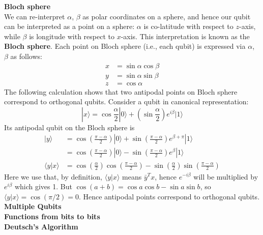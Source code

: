 \textbf{Bloch sphere}\\
We can re-interpret $\alpha$, $\beta$ as polar coordinates on a sphere,
and hence our qubit can be interpreted as a point on a sphere:
$\alpha$ is co-latitude with respect to $z$-axis,
while $\beta$ is longitude with respect to $x$-axis.
This interpretation is known as the \textbf{Bloch sphere}.
Each point on Bloch sphere (i.e., each qubit) is expressed via $\alpha$, $\beta$ as follows:
\begin{align*}
    x &= \sin\alpha \cos\beta \\
    y &= \sin\alpha \sin\beta \\
    z &= \cos\alpha
\end{align*}
The following calculation shows that two antipodal points on Bloch sphere correspond to orthogonal qubits.
Consider a qubit in canonical representation:
$$|x\rangle = \cos{\frac{\alpha}{2}}|0\rangle + (\sin{\frac{\alpha}{2}})e^{i\beta}|1\rangle$$
Its antipodal qubit on the Bloch sphere is
\begin{align*}
    |y\rangle &= \cos\left(\frac{\pi - \alpha}{2}\right) |0\rangle +
                 \sin\left(\frac{\pi - \alpha}{2}\right) e^{\beta + \pi} |1\rangle \\
              &= \cos\left(\frac{\pi - \alpha}{2}\right) |0\rangle -
                 \sin\left(\frac{\pi - \alpha}{2}\right) e^{\beta} |1\rangle \\
    \langle y|x \rangle &= \cos\left(\frac{\alpha}{2}\right) \cos\left(\frac{\pi - \alpha}{2}\right) -
                           \sin\left(\frac{\alpha}{2}\right) \sin\left(\frac{\pi - \alpha}{2}\right)
\end{align*}
Here we use that, by definition,
$\langle y|x \rangle$ means $\bar{y}^T x$,
hence $e^{−i\beta}$ will be multiplied by $e^{i\beta}$ which gives 1.
But $\cos(a + b) = \cos a \cos b − \sin a \sin b$,
so $\langle y|x \rangle = \cos(\pi/2) = 0$.
Hence antipodal points correspond to orthogonal qubits.\\

\textbf{Multiple Qubits}\\



\pagebreak
\textbf{Functions from bits to bits}\\
\textbf{Deutsch’s Algorithm}\\
